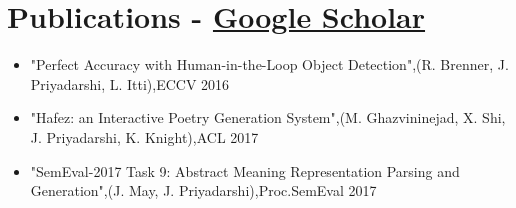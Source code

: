 \newcommand\textlcsc[1]{\textsc{\MakeTextLowercase{#1}}}
\section{Publications - \href{https://scholar.google.com/citations?user=jGa34X4AAAAJ&hl=en}{Google Scholar}}
\begin{itemize}
\setlength\itemsep{-5pt}
\item "Perfect Accuracy with Human-in-the-Loop Object Detection",(R. Brenner, J. Priyadarshi, L. Itti),ECCV 2016
\item "Hafez: an Interactive Poetry Generation System",(M. Ghazvininejad, X. Shi, J. Priyadarshi, K. Knight),ACL 2017
\item "SemEval-2017 Task 9: Abstract Meaning Representation Parsing and Generation",(J. May, J. Priyadarshi),Proc.SemEval 2017
\end{itemize}
